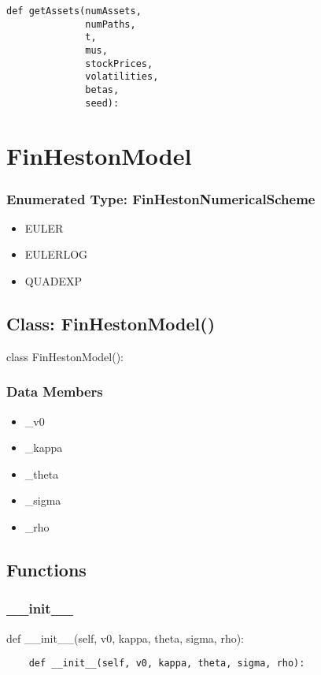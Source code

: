 \documentclass[twoside,11pt]{book}
\begin{document}
\begin{lstlisting}
def getAssets(numAssets,
              numPaths,
              t,
              mus,
              stockPrices,
              volatilities,
              betas,
              seed):
\end{lstlisting}

\newpage
\section{FinHestonModel}

\subsubsection{Enumerated Type: FinHestonNumericalScheme}
\begin{itemize}
\item{EULER}
\item{EULERLOG}
\item{QUADEXP}
\end{itemize}

\subsection*{Class: FinHestonModel()}
class FinHestonModel(): 

\subsubsection*{Data Members}
\begin{itemize}
\item{\_v0}
\item{\_kappa}
\item{\_theta}
\item{\_sigma}
\item{\_rho}
\end{itemize}

\subsection*{Functions}

\subsubsection*{{\bf \_\_init\_\_}}
def \_\_init\_\_(self, v0, kappa, theta, sigma, rho): 

\begin{lstlisting}
    def __init__(self, v0, kappa, theta, sigma, rho):
\end{lstlisting}
\end{document}
